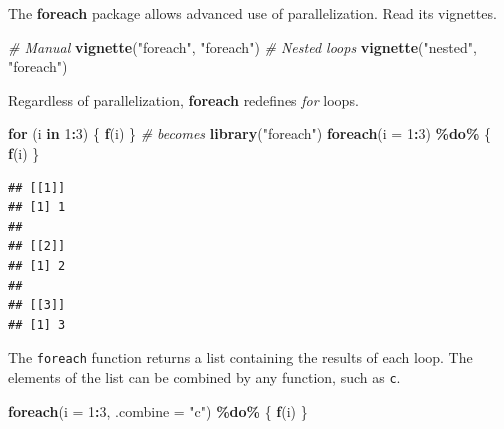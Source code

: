 \documentclass[
  12pt,
  american,
  a4paper,
  extrafontsizes,onecolumn,openright
  ]{memoir}
\newenvironment{Shaded}{\begin{snugshade}}{\end{snugshade}}
\newcommand{\AttributeTok}[1]{\textcolor[rgb]{0.13,0.29,0.53}{#1}}
\newcommand{\CommentTok}[1]{\textcolor[rgb]{0.56,0.35,0.01}{\textit{#1}}}
\newcommand{\ControlFlowTok}[1]{\textcolor[rgb]{0.13,0.29,0.53}{\textbf{#1}}}
\newcommand{\DecValTok}[1]{\textcolor[rgb]{0.00,0.00,0.81}{#1}}
\newcommand{\FunctionTok}[1]{\textcolor[rgb]{0.13,0.29,0.53}{\textbf{#1}}}
\newcommand{\NormalTok}[1]{#1}
\newcommand{\SpecialCharTok}[1]{\textcolor[rgb]{0.81,0.36,0.00}{\textbf{#1}}}
\newcommand{\StringTok}[1]{\textcolor[rgb]{0.31,0.60,0.02}{#1}}
\begin{document}
The \textbf{foreach} package allows advanced use of parallelization.
Read its vignettes.

\scriptsize

\begin{Shaded}
\begin{Highlighting}[]
\CommentTok{\# Manual}
\FunctionTok{vignette}\NormalTok{(}\StringTok{"foreach"}\NormalTok{, }\StringTok{"foreach"}\NormalTok{)}
\CommentTok{\# Nested loops}
\FunctionTok{vignette}\NormalTok{(}\StringTok{"nested"}\NormalTok{, }\StringTok{"foreach"}\NormalTok{)}
\end{Highlighting}
\end{Shaded}

\normalsize

Regardless of parallelization, \textbf{foreach} redefines \emph{for} loops.

\scriptsize

\begin{Shaded}
\begin{Highlighting}[]
\ControlFlowTok{for}\NormalTok{ (i }\ControlFlowTok{in} \DecValTok{1}\SpecialCharTok{:}\DecValTok{3}\NormalTok{) \{}
  \FunctionTok{f}\NormalTok{(i)}
\NormalTok{\}}
\CommentTok{\# becomes}
\FunctionTok{library}\NormalTok{(}\StringTok{"foreach"}\NormalTok{)}
\FunctionTok{foreach}\NormalTok{(}\AttributeTok{i =} \DecValTok{1}\SpecialCharTok{:}\DecValTok{3}\NormalTok{) }\SpecialCharTok{\%do\%}\NormalTok{ \{}
  \FunctionTok{f}\NormalTok{(i)}
\NormalTok{\}}
\end{Highlighting}
\end{Shaded}

\begin{verbatim}
## [[1]]
## [1] 1
## 
## [[2]]
## [1] 2
## 
## [[3]]
## [1] 3
\end{verbatim}

\normalsize

The \texttt{foreach} function returns a list containing the results of each loop.
The elements of the list can be combined by any function, such as \texttt{c}.

\scriptsize

\begin{Shaded}
\begin{Highlighting}[]
\FunctionTok{foreach}\NormalTok{(}\AttributeTok{i =} \DecValTok{1}\SpecialCharTok{:}\DecValTok{3}\NormalTok{, }\AttributeTok{.combine =} \StringTok{"c"}\NormalTok{) }\SpecialCharTok{\%do\%}\NormalTok{ \{}
  \FunctionTok{f}\NormalTok{(i)}
\NormalTok{\}}
\end{Highlighting}
\end{Shaded}
\end{document}
